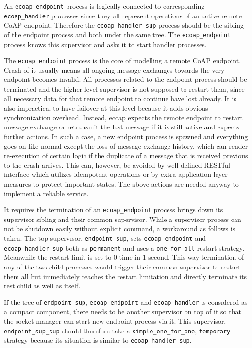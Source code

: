 An \verb|ecoap_endpoint| process is logically connected to corresponding \verb|ecoap_handler| processes since they all represent operations of an active remote CoAP endpoint. Therefore the \verb|ecoap_handler_sup| process should be the sibling of the endpoint process and both under the same tree. The \verb|ecoap_endpoint| process knows this supervisor and asks it to start handler processes.

The \verb|ecoap_endpoint| process is the core of modelling a remote CoAP endpoint. Crash of it usually means all ongoing message exchanges towards the very endpoint becomes invalid. All processes related to the endpoint process should be terminated and the higher level supervisor is not supposed to restart them, since all necessary data for that remote endpoint to continue have lost already. It is also impractical to have failover at this level because it adds obvious synchronization overhead. Instead, ecoap expects the remote endpoint to restart message exchange or retransmit the last message if it is still active and expects further actions. In such a case, a new endpoint process is spawned and everything goes on like normal except the loss of message exchange history, which can render re-execution of certain logic if the duplicate of a message that is received previous to the crash arrives. This can, however, be avoided by well-defined RESTful interface which utilizes idempotent operations or by extra application-layer measures to protect important states. The above actions are needed anyway to implement a reliable service.

It requires the termination of an \verb|ecoap_endpoint| process brings down its supervisor sibling and their common supervisor. While a supervisor process can not be shutdown easily without explicit command, a workaround as follows is taken. The top supervisor, \verb|endpoint_sup|, sets \verb|ecoap_endpoint| and \verb|ecoap_handler_sup| both as \verb|permanent| and uses a \verb|one_for_all| restart strategy. Meanwhile the restart limit is set to 0 time in 1 second. This way termination of any of the two child processes would trigger their common supervisor to restart them all but immediately reaches the restart limitation and directly terminate its rest child as well as itself. 

If the tree of \verb|endpoint_sup|, \verb|ecoap_endpoint| and \verb|ecoap_handler| is considered as a compact component, there needs to be another supervisor on top of it so that the socket manager can start new endpoint process via it. This supervisor, \verb|endpoint_sup_sup| should therefore take a \verb|simple_one_for_one|, \verb|temporary| strategy because its situation is similar to \verb|ecoap_handler_sup|. 

